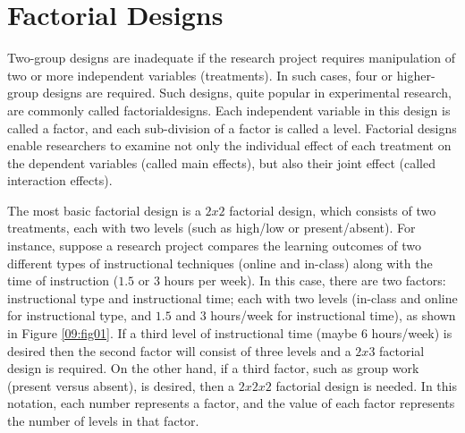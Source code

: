 \section{Factorial Designs}

Two-group designs are inadequate if the research project requires manipulation of two or more independent variables (treatments). In such cases, four or higher-group designs are required. Such designs, quite popular in experimental research, are commonly called \glspl{factorialdesign}. Each independent variable in this design is called a factor, and each sub-division of a factor is called a level. Factorial designs enable researchers to examine not only the individual effect of each treatment on the dependent variables (called main effects), but also their joint effect (called interaction effects).

The most basic factorial design is a $ 2 x 2 $ factorial design, which consists of two treatments, each with two levels (such as high/low or present/absent). For instance, suppose a research project compares the learning outcomes of two different types of instructional techniques (online and in-class) along with the time of instruction ($ 1.5 $ or $ 3 $ hours per week). In this case, there are two factors: instructional type and instructional time; each with two levels (in-class and online for instructional type, and $ 1.5 $ and $ 3 $ hours/week for instructional time), as shown in Figure \ref{09:fig01}. If a third level of instructional time (maybe $ 6 $ hours/week) is desired then the second factor will consist of three levels and a $ 2 x 3 $ factorial design is required. On the other hand, if a third factor, such as group work (present versus absent), is desired, then a $ 2 x 2 x 2 $ factorial design is needed. In this notation, each number represents a factor, and the value of each factor represents the number of levels in that factor.

